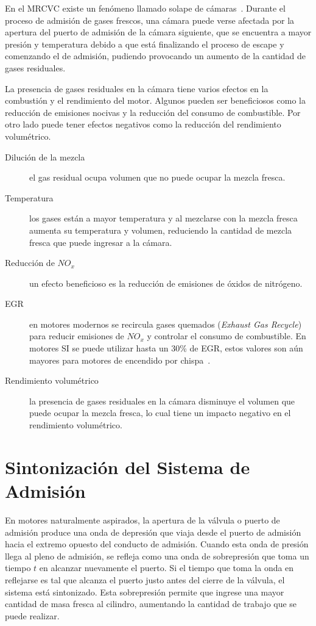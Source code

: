 
En el MRCVC existe un fenómeno llamado solape de cámaras~\parencite{lopez13}.
%
Durante el proceso de admisión de gases frescos, una cámara puede verse afectada
por la apertura del puerto de admisión de la cámara siguiente, que se encuentra
a mayor presión y temperatura debido a que está finalizando el proceso de escape
y comenzando el de admisión, pudiendo provocando un aumento de la cantidad de gases
residuales.


La presencia de gases residuales en la cámara tiene varios efectos en la
combustión y el rendimiento del motor.
%
Algunos pueden ser beneficiosos como la reducción de emisiones nocivas y la
reducción del consumo de combustible.
%
Por otro lado puede tener efectos negativos como la reducción del rendimiento
volumétrico.
%
\begin{description}
  \item[Dilución de la mezcla] el gas residual ocupa volumen que no puede ocupar la mezcla fresca.
  \item[Temperatura] los gases están a mayor temperatura y al mezclarse con la mezcla fresca aumenta su temperatura y volumen, reduciendo la cantidad de mezcla fresca que puede ingresar a la cámara.
  \item[Reducción de $NO_{x}$] un efecto beneficioso es la reducción de emisiones de óxidos de nitrógeno.
  \item[EGR] en motores modernos se recircula gases quemados (\textit{Exhaust Gas Recycle}) para reducir emisiones de $NO_{x}$ y controlar el consumo de combustible. En motores SI se puede utilizar hasta un 30\% de EGR, estos valores son aún mayores para motores de encendido por chispa~\parencite{heywood}.
  \item[Rendimiento volumétrico] la presencia de gases residuales en la cámara disminuye el volumen que puede ocupar la mezcla fresca, lo cual tiene un impacto negativo en el rendimiento volumétrico.
\end{description}

\section{Sintonización del Sistema de Admisión}\label{cap2_sec_sintonia_admision}
%
En motores naturalmente aspirados, la apertura de la válvula o puerto de
admisión produce una onda de depresión que viaja desde el puerto de admisión
hacia el extremo opuesto del conducto de admisión.
%
Cuando esta onda de presión llega al pleno de admisión, se refleja como una
onda de sobrepresión que toma un tiempo $t$ en alcanzar nuevamente el puerto.
%
Si el tiempo que toma la onda en reflejarse es tal que alcanza el puerto justo
antes del cierre de la válvula, el sistema está sintonizado.
%
Esta sobrepresión permite que ingrese una mayor cantidad de masa fresca al
cilindro, aumentando la cantidad de trabajo que se puede realizar.


